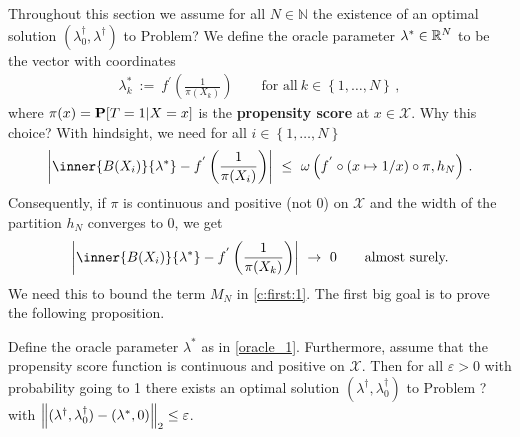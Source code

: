 Throughout this section we assume for all $N\in\mathbb{N}$ the existence of an 
optimal solution 
$(\lambda_0^\dagger,\lambda^\dagger)$
to Problem?
We define the oracle parameter $\lambda^*\in\R^N$ to be the vector with coordinates
\begin{gather}
  \label{oracle_1}
  \lambda^*_k
  \ 
  :=
  \ 
  f^{'}
  \left( 
    \frac{1}{\pi(X_k)}
  \right)
  \qquad
  \text{for all}\ 
  k\in \left\{ 1,\ldots,N \right\}
  \,,
\end{gather}
where $\pi(x)=\P[T=1|X=x]$ is the \textbf{propensity score} at $x\in\mathcal{X}$. Why this choice? 
With hindsight, we need
for all $i\in \left\{ 1,\ldots,N \right\}$
\begin{gather}
\left| 
\inner{B(X_i)}
{\lambda^*}
  -
  f^{'}
  \left( 
    \frac{1}{\pi(X_i)}
  \right)
\right|
\ 
\le
\ 
      \omega
      \left( f^{'}\circ (x\mapsto1/x)\circ \pi,h_N \right)
      \,.
\end{gather}
Consequently, if $\pi$ is continuous and positive (not 0) on $\mathcal{X}$ and the width of the partition $h_N$ converges to 0, we get 
\begin{gather}
 \left| 
  \inner{B(X_i)}{\lambda^*}
  -
  f^{'}
  \left( 
    \frac{1}{\pi(X_k)}
  \right)
 \right| 
 \
 \to
 \ 
 0
 \qquad
 \text{almost surely.}
\end{gather}
We need this to bound the term $M_N$ in \eqref{c:first:1}.
The first big goal is to prove the following proposition.
\begin{proposition}
  \label{bw:cd:th}
Define the oracle parameter $\lambda^*$ as in \eqref{oracle_1}.
Furthermore, assume that the propensity score function is continuous and positive on $\mathcal{X}$.
Then for all $\varepsilon>0$ with probability going to 1 there exists an optimal solution
     $(\lambda^\dagger,\lambda_0^\dagger)$
     to Problem ? with
     $
     \norm
     {
       (\lambda^\dagger,\lambda_0^\dagger)
      -
      (\lambda^*,0)
     }_2
     \le
     \varepsilon
     $.
\end{proposition}
